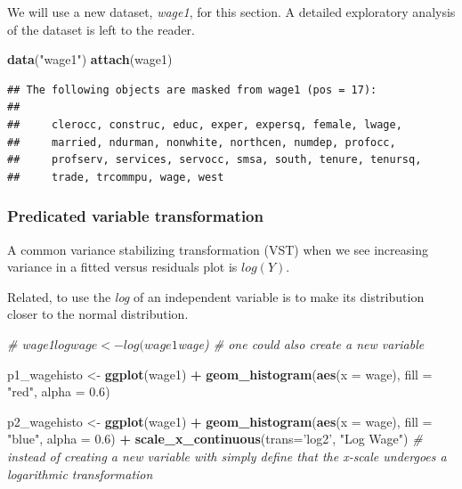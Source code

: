 \documentclass[]{book}
\newenvironment{Shaded}{\begin{snugshade}}{\end{snugshade}}
\newcommand{\CommentTok}[1]{\textcolor[rgb]{0.56,0.35,0.01}{\textit{#1}}}
\newcommand{\DataTypeTok}[1]{\textcolor[rgb]{0.13,0.29,0.53}{#1}}
\newcommand{\FloatTok}[1]{\textcolor[rgb]{0.00,0.00,0.81}{#1}}
\newcommand{\KeywordTok}[1]{\textcolor[rgb]{0.13,0.29,0.53}{\textbf{#1}}}
\newcommand{\NormalTok}[1]{#1}
\newcommand{\OperatorTok}[1]{\textcolor[rgb]{0.81,0.36,0.00}{\textbf{#1}}}
\newcommand{\StringTok}[1]{\textcolor[rgb]{0.31,0.60,0.02}{#1}}
\begin{document}
We will use a new dataset, \emph{wage1}, for this section. A detailed
exploratory analysis of the dataset is left to the reader.

\begin{Shaded}
\begin{Highlighting}[]
\KeywordTok{data}\NormalTok{(}\StringTok{"wage1"}\NormalTok{)}
\KeywordTok{attach}\NormalTok{(wage1)}
\end{Highlighting}
\end{Shaded}

\begin{verbatim}
## The following objects are masked from wage1 (pos = 17):
## 
##     clerocc, construc, educ, exper, expersq, female, lwage,
##     married, ndurman, nonwhite, northcen, numdep, profocc,
##     profserv, services, servocc, smsa, south, tenure, tenursq,
##     trade, trcommpu, wage, west
\end{verbatim}

\hypertarget{predicated-variable-transformation}{%
\subsubsection{Predicated variable
transformation}\label{predicated-variable-transformation}}

A common variance stabilizing transformation (VST) when we see
increasing variance in a fitted versus residuals plot is \(log(Y)\).

Related, to use the \emph{log} of an independent variable is to make its
distribution closer to the normal distribution.

\begin{Shaded}
\begin{Highlighting}[]
\CommentTok{# wage1$logwage <- log(wage1$wage) # one could also create a new variable }

\NormalTok{p1_wagehisto <-}\StringTok{ }\KeywordTok{ggplot}\NormalTok{(wage1)  }\OperatorTok{+}
\StringTok{  }\KeywordTok{geom_histogram}\NormalTok{(}\KeywordTok{aes}\NormalTok{(}\DataTypeTok{x =}\NormalTok{ wage), }\DataTypeTok{fill =} \StringTok{"red"}\NormalTok{, }\DataTypeTok{alpha =} \FloatTok{0.6}\NormalTok{)}

\NormalTok{p2_wagehisto <-}\StringTok{ }\KeywordTok{ggplot}\NormalTok{(wage1)  }\OperatorTok{+}
\StringTok{  }\KeywordTok{geom_histogram}\NormalTok{(}\KeywordTok{aes}\NormalTok{(}\DataTypeTok{x =}\NormalTok{ wage),  }\DataTypeTok{fill =} \StringTok{"blue"}\NormalTok{, }\DataTypeTok{alpha =} \FloatTok{0.6}\NormalTok{) }\OperatorTok{+}
\StringTok{  }\KeywordTok{scale_x_continuous}\NormalTok{(}\DataTypeTok{trans=}\StringTok{'log2'}\NormalTok{, }\StringTok{"Log Wage"}\NormalTok{)  }\CommentTok{# instead of creating a new variable with simply define that the x-scale undergoes a logarithmic transformation}
\end{Highlighting}
\end{Shaded}
\end{document}
